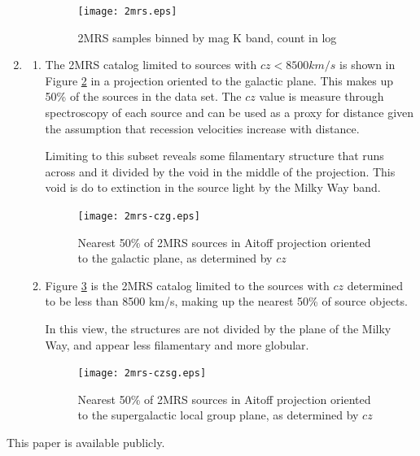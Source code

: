 \documentclass{paper}
\begin{document}
\begin{enumerate}
\begin{enumerate}
        \begin{figure}[!htb]
          \texttt{[image: 2mrs.eps]}
          \caption{2MRS samples binned by mag K band, count in log}
          \label{fig:2mrs-bins}
        \end{figure}

    \end{enumerate}
  \pagebreak \item %
    \begin{enumerate}
      \item
        The 2MRS catalog limited to sources with $cz < 8500 km/s$ is shown in
        Figure \ref{fig:2mrs-czg} in a projection oriented to the galactic
        plane. This makes up 50\% of the sources in the data set. The 
        $cz$ value is measure through spectroscopy of each source and can be
        used as a proxy for distance given the assumption that recession
        velocities increase with distance.

        Limiting to this subset reveals some filamentary structure that runs 
        across and it divided by the void in the middle of the projection. 
        This void is do to extinction in the source light by the Milky Way 
        band.

        \begin{figure}[!htb]
          \texttt{[image: 2mrs-czg.eps]}
          \caption{Nearest 50\% of 2MRS sources in Aitoff projection 
            oriented to the galactic plane, as determined by $cz$}
          \label{fig:2mrs-czg}
        \end{figure}
    
      \item
        Figure \ref{fig:2mrs-czsg} is the 2MRS catalog limited to the sources 
        with $cz$ determined to be less than 8500 km/s, making up the nearest
        50\% of source objects. 

        In this view, the structures are not divided by the plane of the
        Milky Way, and appear less filamentary and more globular.
        \begin{figure}[!htb]
          \texttt{[image: 2mrs-czsg.eps]}
          \caption{Nearest 50\% of 2MRS sources in Aitoff projection 
            oriented to the supergalactic local group plane, as determined 
            by $cz$}
          \label{fig:2mrs-czsg}
        \end{figure}
    \end{enumerate}
\end{enumerate}

This paper is available publicly.\cite{Hayden_Cosmology_Source_Repo}

\pagebreak
\printbibliography
\end{document}
